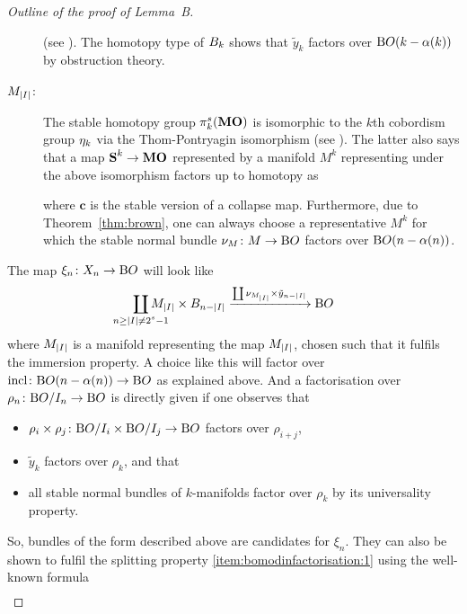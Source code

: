 \begin{proof}[Outline of the proof of Lemma~B]
\begin{description}
    (see \cite[Chap.~II, §2]{immersionconj}).
    The homotopy type of $B_{k}$ shows that $\tilde y_k$
    factors over $\mathrm{B}O(k-\alpha(k))$ by obstruction theory.
  \item[$M_{\left|I\right|}$:]
    The stable homotopy group $\pi_k^s(\bm{\mathrm{MO}})$ is isomorphic
    to the $k$th cobordism group $\eta_k$
    via the Thom-Pontryagin isomorphism (see \cite[Chap.~II]{stong}).
    The latter also says that a map $\bm{\mathrm{S}}^{k}\to\bm{\mathrm{MO}}$
    represented by a manifold $M^k$ representing under the above
    isomorphism factors up to homotopy as
    \begin{center}
    \end{center}
    where $\bm{c}$ is the stable version of a collapse map.
    Furthermore, due to Theorem~\ref{thm:brown}, one can always choose
    a representative $M^k$ for which the stable normal bundle
    $\nu_{M}\colon M\to\mathrm{B}O$ factors over $\mathrm{B}O(n-\alpha(n))$.
  \end{description}
  The map $\xi_n\colon X_n\to\mathrm{B}O$ will look like
  \begin{gather*}
    \coprod_{\mathclap{n\geq\Deg{I}\neq 2^s-1}}
    M_{\Deg{I}} \times \BraidSpace{n-\Deg{I}}
    \xrightarrow{\coprod \N{M_{\Deg{I}}} \times \tilde y_{n-\Deg{I}}}
    \BO
  \end{gather*}
  where $M_{\left|I\right|}$ is a manifold representing the map
  $M_{\left|I\right|}$, chosen such that it fulfils the immersion
  property.
  A choice like this will factor over
  $\mathrm{incl}\colon\mathrm{B}O(n-\alpha(n))\to\mathrm{B}O$ as explained above.
  And a factorisation over $\rho_n\colon\mathrm{B}O/I_{n}\to\mathrm{B}O$ is directly
  given if one observes that
  \begin{itemize}
  \item $\rho_i\times\rho_j\colon\mathrm{B}O/I_{i}\times\mathrm{B}O/I_{j}\to\mathrm{B}O$ factors
    over $\rho_{i+j}$,
  \item $\tilde y_k$ factors over $\rho_k$, and that
  \item all stable normal bundles of $k$-manifolds factor over
    $\rho_k$ by its universality property.
  \end{itemize}
  So, bundles of the form described above are candidates
  for $\xi_n$.
  They can also be shown to fulfil the splitting
  property \ref{item:bomodinfactorisation:1} using the well-known
  formula
  \begin{gather*}

\end{gather*}
\end{proof}
